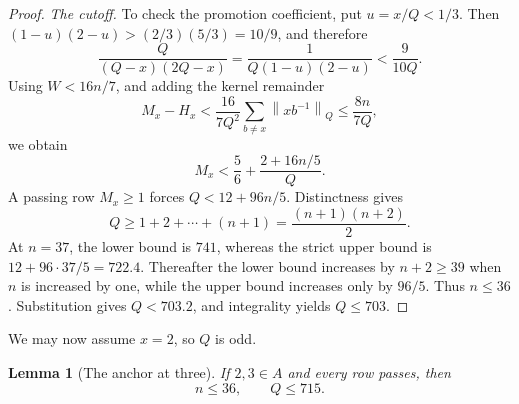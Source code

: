 \documentclass[11pt]{article}
\newtheorem{lemma}[theorem]{Lemma}
\theoremstyle{definition}
\theoremstyle{remark}
\newcommand{\normQ}[1]{\left\lVert #1\right\rVert_Q}
\begin{document}
\begin{proof}
\smallskip
\noindent\emph{The cutoff.}
To check the promotion coefficient, put \(u=x/Q<1/3\).  Then
\((1-u)(2-u)>(2/3)(5/3)=10/9\), and therefore
\[
 \frac{Q}{(Q-x)(2Q-x)}
 =\frac1{Q(1-u)(2-u)}<\frac9{10Q}.
\]
Using \(W<16n/7\), and adding the kernel remainder
\[
 M_x-H_x<\frac{16}{7Q^2}\sum_{b\ne x}\normQ{xb^{-1}}
 \le\frac{8n}{7Q},
\]
we obtain
\begin{equation}\label{eq:s1-x-M}
 M_x<\frac56+\frac{2+16n/5}{Q}.
\end{equation}
A passing row \(M_x\ge1\) forces \(Q<12+96n/5\).  Distinctness gives
\begin{equation}\label{eq:s1-distinct-sum}
 Q\ge1+2+\cdots+(n+1)=\frac{(n+1)(n+2)}2.
\end{equation}
At \(n=37\), the lower bound is \(741\), whereas the strict upper bound
is \(12+96\cdot37/5=722.4\).  Thereafter the lower bound increases by
\(n+2\ge39\) when \(n\) is increased by one, while the upper bound
increases only by \(96/5\).  Thus \(n\le36\).  Substitution gives
\(Q<703.2\), and integrality yields \(Q\le703\).
\end{proof}

We may now assume \(x=2\), so \(Q\) is odd.

\begin{lemma}[The anchor at three]\label{lem:s1-three}
If \(2,3\in A\) and every row passes, then
\[
 n\le36,\qquad Q\le715.
\]
\end{lemma}
\end{document}
